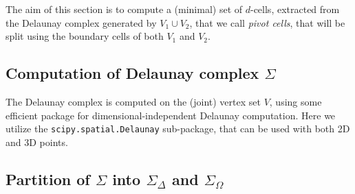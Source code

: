 \documentclass[11pt,oneside]{article}	%
\begin{document}
The aim of this section is to compute a (minimal) set of $d$-cells, extracted from the Delaunay complex generated by $V_1 \cup V_2$, that we call \emph{pivot cells}, that will be split using the boundary cells of both $V_1$ and $V_2$.

\subsection{Computation of Delaunay complex $\Sigma$}

The Delaunay complex is computed on the (joint) vertex set $V$, using some efficient package for dimensional-independent Delaunay computation. Here we utilize the \texttt{scipy.spatial.Delaunay} sub-package, that can be used with both 2D and 3D points. 


\subsection{Partition of $\Sigma$ into $\Sigma_\Delta$ and $\Sigma_\Omega$}
\end{document}
